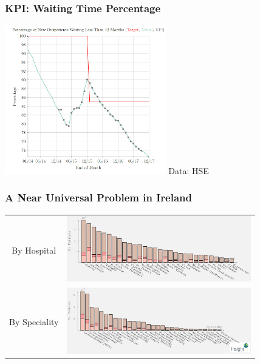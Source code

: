 \begin{frame}
\frametitle{KPI: Waiting Time Percentage}
\includegraphics[width=7cm]{imagesoutpatient/kpiwaitingtimepercentagedec2017}
{\scriptsize Data: HSE}
\end{frame}




\begin{frame}
\frametitle{A Near Universal Problem in Ireland}
\begin{tabular}{cc}
By Hospital &
\includegraphics[width=8cm]{imagesoutpatient/byhospital}\\
By Speciality &
\includegraphics[width=8cm]{imagesoutpatient/byspeciality}
\end{tabular}
\end{frame}

